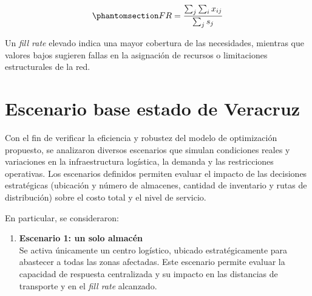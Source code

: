 \documentclass[
  spanish,
  us-letterpaper,
  DIV=11,
  numbers=noendperiod]{scrreprt}
\providecommand{\tightlist}{%
  \setlength{\itemsep}{0pt}\setlength{\parskip}{0pt}}
\numberwithin{equation}{section}
\begin{document}
\begin{equation}\phantomsection\label{eq-FR}{
FR = \frac{\sum_{j} \sum_i x_{ij}}{\sum_j s_j} 
}\end{equation}

Un \emph{fill rate} elevado indica una mayor cobertura de las
necesidades, mientras que valores bajos sugieren fallas en la asignación
de recursos o limitaciones estructurales de la red.

\section{Escenario base estado de
Veracruz}\label{escenario-base-estado-de-veracruz}

Con el fin de verificar la eficiencia y robustez del modelo de
optimización propuesto, se analizaron diversos escenarios que simulan
condiciones reales y variaciones en la infraestructura logística, la
demanda y las restricciones operativas. Los escenarios definidos
permiten evaluar el impacto de las decisiones estratégicas (ubicación y
número de almacenes, cantidad de inventario y rutas de distribución)
sobre el costo total y el nivel de servicio.

En particular, se consideraron:

\begin{enumerate}
\def\labelenumi{\arabic{enumi}.}
\tightlist
\item
  \textbf{Escenario 1: un solo almacén}\\
  Se activa únicamente un centro logístico, ubicado estratégicamente
  para abastecer a todas las zonas afectadas. Este escenario permite
  evaluar la capacidad de respuesta centralizada y su impacto en las
  distancias de transporte y en el \emph{fill rate} alcanzado.
\end{enumerate}
\end{document}
